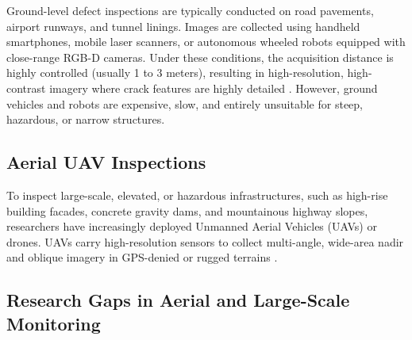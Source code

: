 \hs Ground-level defect inspections are typically conducted on road pavements, airport runways, and tunnel linings. Images are collected using handheld smartphones, mobile laser scanners, or autonomous wheeled robots equipped with close-range RGB-D cameras. Under these conditions, the acquisition distance is highly controlled (usually 1 to 3 meters), resulting in high-resolution, high-contrast imagery where crack features are highly detailed \cite{zhen-liang-2025,kyem-2025,zhao-2026,zhang-2024b, gharehbaghi-2026b}. However, ground vehicles and robots are expensive, slow, and entirely unsuitable for steep, hazardous, or narrow structures.

\subsection{Aerial UAV Inspections}

\hs To inspect large-scale, elevated, or hazardous infrastructures, such as high-rise building facades, concrete gravity dams, and mountainous highway slopes, researchers have increasingly deployed Unmanned Aerial Vehicles (UAVs) or drones. UAVs carry high-resolution sensors to collect multi-angle, wide-area nadir and oblique imagery in GPS-denied or rugged terrains \cite{zhang-2024a, chen-2026,chen-2024,zhao-2026,gharehbaghi-2026a,wang-2025}.

\subsection{Research Gaps in Aerial and Large-Scale Monitoring}

